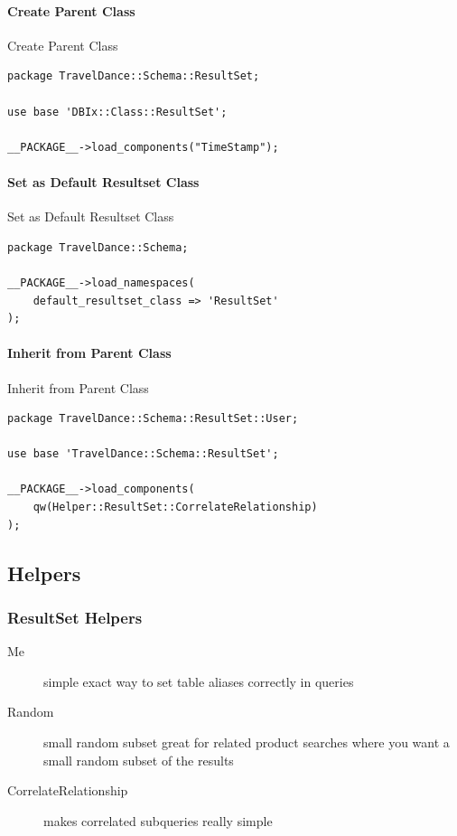 \paragraph{Create Parent Class}

\begin{frame}[fragile]{Create Parent Class}
\begin{lstlisting}
package TravelDance::Schema::ResultSet;

use base 'DBIx::Class::ResultSet';

__PACKAGE__->load_components("TimeStamp");
\end{lstlisting}
\end{frame}

\paragraph{Set as Default Resultset Class}

\begin{frame}[fragile]{Set as Default Resultset Class}
\begin{lstlisting}
package TravelDance::Schema;

__PACKAGE__->load_namespaces(
    default_resultset_class => 'ResultSet'
);

\end{lstlisting}
\end{frame}

\paragraph{Inherit from Parent Class}
\begin{frame}[fragile]{Inherit from Parent Class}
\begin{lstlisting}
package TravelDance::Schema::ResultSet::User;

use base 'TravelDance::Schema::ResultSet';

__PACKAGE__->load_components(
    qw(Helper::ResultSet::CorrelateRelationship)
);
\end{lstlisting}
\end{frame}

\subsection{Helpers}
\subsubsection{ResultSet Helpers}
\begin{description}
\item[Me] 
simple exact way to set table aliases correctly in queries
\item[Random] small random subset
great for related product searches where you want a small 
random subset of the results
\item[CorrelateRelationship] 
makes correlated subqueries really simple
\end{description}

